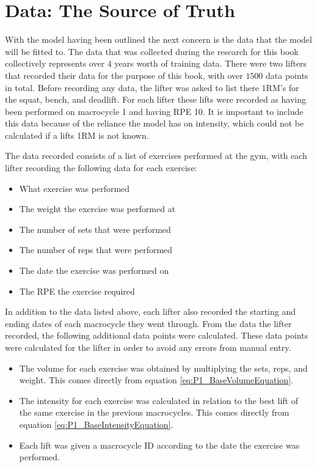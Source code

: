 \chapter{
    Data: The Source of Truth
}
\label{ch:DataSection}

With the model having been outlined the next concern is the data that the model will be fitted to. The data that was collected during the research for this book collectively represents over $4$ years worth of training data. There were two lifters that recorded their data for the purpose of this book, with over $1500$ data points in total. Before recording any data, the lifter was asked to list there 1RM's for the squat, bench, and deadlift. For each lifter these lifts were recorded as having been performed on macrocycle 1 and having RPE 10. It is important to include this data because of the reliance the model has on intensity, which could not be calculated if a lifts 1RM is not known.

The data recorded consists of a list of exercises performed at the gym, with each lifter recording the following data for each exercise:

\begin{itemize}
    \item What exercise was performed
    \item The weight the exercise was performed at
    \item The number of sets that were performed
    \item The number of reps that were performed
    \item The date the exercise was performed on
    \item The RPE the exercise required
\end{itemize}

In addition to the data listed above, each lifter also recorded the starting and ending dates of each macrocycle they went through. From the data the lifter recorded, the following additional data points were calculated. These data points were calculated for the lifter in order to avoid any errors from manual entry.

\begin{itemize}
    \item The volume for each exercise was obtained by multiplying the sets, reps, and weight. This comes directly from equation \ref{eq:P1_BaseVolumeEquation}.
    \item The intensity for each exercise was calculated in relation to the best lift of the same exercise in the previous macrocycles. This comes directly from equation \ref{eq:P1_BaseIntensityEquation}.
    \item Each lift was given a macrocycle ID according to the date the exercise was performed.
\end{itemize}

